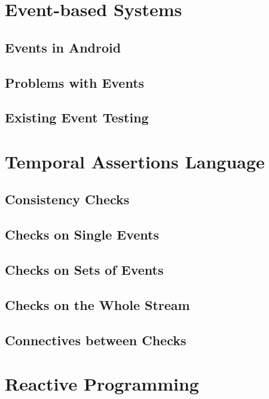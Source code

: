 \documentclass[11pt,a4paper,notitlepage]{article}
\begin{document}
\section{Event-based Systems}

\subsection{Events in Android}

\subsection{Problems with Events}

\subsection{Existing Event Testing}



\section{Temporal Assertions Language}

\subsection{Consistency Checks}

\subsection{Checks on Single Events}

\subsection{Checks on Sets of Events}

\subsection{Checks on the Whole Stream}

\subsection{Connectives between Checks}



\section{Reactive Programming}
\end{document}
